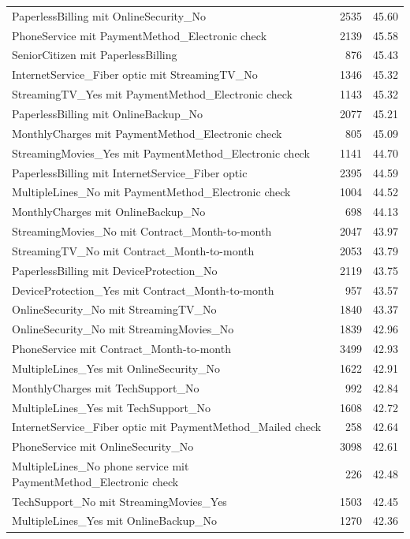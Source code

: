 \documentclass[a4paper,11pt]{article}
\begin{document}
\begin{longtable}{p{9cm}rr}
PaperlessBilling mit OnlineSecurity\_No & 2535 & 45.60 \\
PhoneService mit PaymentMethod\_Electronic check & 2139 & 45.58 \\
SeniorCitizen mit PaperlessBilling & 876 & 45.43 \\
InternetService\_Fiber optic mit StreamingTV\_No & 1346 & 45.32 \\
StreamingTV\_Yes mit PaymentMethod\_Electronic check & 1143 & 45.32 \\
PaperlessBilling mit OnlineBackup\_No & 2077 & 45.21 \\
MonthlyCharges mit PaymentMethod\_Electronic check & 805 & 45.09 \\
StreamingMovies\_Yes mit PaymentMethod\_Electronic check & 1141 & 44.70 \\
PaperlessBilling mit InternetService\_Fiber optic & 2395 & 44.59 \\
MultipleLines\_No mit PaymentMethod\_Electronic check & 1004 & 44.52 \\
MonthlyCharges mit OnlineBackup\_No & 698 & 44.13 \\
StreamingMovies\_No mit Contract\_Month-to-month & 2047 & 43.97 \\
StreamingTV\_No mit Contract\_Month-to-month & 2053 & 43.79 \\
PaperlessBilling mit DeviceProtection\_No & 2119 & 43.75 \\
DeviceProtection\_Yes mit Contract\_Month-to-month & 957 & 43.57 \\
OnlineSecurity\_No mit StreamingTV\_No & 1840 & 43.37 \\
OnlineSecurity\_No mit StreamingMovies\_No & 1839 & 42.96 \\
PhoneService mit Contract\_Month-to-month & 3499 & 42.93 \\
MultipleLines\_Yes mit OnlineSecurity\_No & 1622 & 42.91 \\
MonthlyCharges mit TechSupport\_No & 992 & 42.84 \\
MultipleLines\_Yes mit TechSupport\_No & 1608 & 42.72 \\
InternetService\_Fiber optic mit PaymentMethod\_Mailed check & 258 & 42.64 \\
PhoneService mit OnlineSecurity\_No & 3098 & 42.61 \\
MultipleLines\_No phone service mit PaymentMethod\_Electronic check & 226 & 42.48 \\
TechSupport\_No mit StreamingMovies\_Yes & 1503 & 42.45 \\
MultipleLines\_Yes mit OnlineBackup\_No & 1270 & 42.36 \\

\end{longtable}
\end{document}

